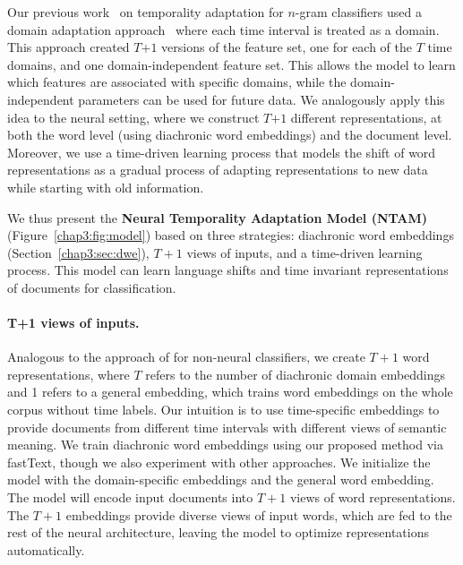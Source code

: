 
Our previous work~\cite{huang2018examining} on temporality adaptation for $n$-gram classifiers used a domain adaptation approach~\cite{daume2007frustratingly} where 
each time interval is treated as a domain.
This approach created $T$$+1$ versions of the feature set, one for each of the $T$ time domains, and one domain-independent feature set.
This allows the model to learn which features are associated with specific domains, while the domain-independent parameters can be used for future data.
We analogously apply this idea to the neural setting, where we construct $T$$+1$ different representations, at both the word level (using diachronic word embeddings) and the document level.
Moreover, we use a time-driven learning process that models
the shift of word representations as a gradual process of adapting representations to new data while starting with old information.

We thus present the {\bf Neural Temporality Adaptation Model (NTAM)} (Figure~\ref{chap3:fig:model}) based on three strategies: diachronic word embeddings (Section~\ref{chap3:sec:dwe}), $T+1$ views of inputs, and a time-driven learning process.
This model can learn language shifts and time invariant representations of documents for classification.

\paragraph{T+1 views of inputs.}
Analogous to the approach of \cite{daume2007frustratingly} for non-neural classifiers, 
we create $T+1$ word representations, where $T$ refers to the number of diachronic domain embeddings and 1 refers to a general embedding, which trains word embeddings on the whole corpus without time labels. Our intuition is to use time-specific embeddings to provide documents from different time intervals with different views of semantic meaning. 
We train diachronic word embeddings using our proposed method via fastText, though we also experiment with other approaches. 
We initialize the model with the domain-specific embeddings and the general word embedding. The model will encode input documents into $T+1$ views of word representations. 
The $T+1$ embeddings provide diverse views of input words, which are fed to the rest of the neural architecture, leaving the model to optimize representations automatically.


